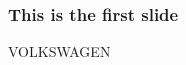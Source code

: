 \documentclass[10pt]{beamer}
\begin{document}
	\begin{frame}
		\frametitle{This is the first slide}
    \rmfamily
    VOLKSWAGEN
	\end{frame}
\end{document}
